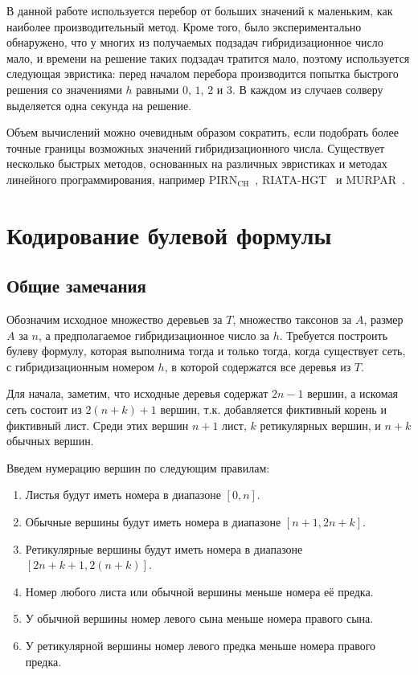 В данной работе используется перебор от больших значений к маленьким, как наиболее производительный метод.
Кроме того, было экспериментально обнаружено, что у многих из получаемых подзадач гибридизационное число мало, и времени на решение таких подзадач тратится мало, поэтому используется следующая эвристика: перед началом перебора производится попытка быстрого решения со значениями $h$ равными $0$, $1$, $2$ и $3$. В каждом из случаев солверу выделяется одна секунда на решение.


Объем вычислений можно очевидным образом сократить, если подобрать более точные границы возможных значений гибридизационного числа.
Существует несколько быстрых методов, основанных на различных эвристиках и методах линейного программирования, например PIRN$\mathrm{_{CH}}$~\cite{wu2010close}, RIATA-HGT~\cite{nakhleh2005riata} и MURPAR~\cite{park2012murpar}.

\FloatBarrier
\section{Кодирование булевой формулы}

\subsection{Общие замечания}

Обозначим исходное множество деревьев за $T$, множество таксонов за $A$, размер $A$ за $n$, а предполагаемое гибридизационное число за $h$. Требуется построить булеву формулу, которая выполнима тогда и только тогда, когда существует сеть, с гибридизационным номером $h$, в которой содержатся все деревья из $T$.

Для начала, заметим, что исходные деревья содержат $2 n - 1$ вершин, а искомая сеть состоит из $2 (n + k) + 1$ вершин, т.к. добавляется фиктивный корень и фиктивный лист. Среди этих вершин $n + 1$ лист, $k$ ретикулярных вершин, и $n + k$ обычных вершин.

Введем нумерацию вершин по следующим правилам:

\begin{enumerate}
	\item Листья будут иметь номера в диапазоне $[0, n]$.
	\item Обычные вершины будут иметь номера в диапазоне $[n + 1, 2n + k]$.
	\item Ретикулярные вершины будут иметь номера в диапазоне $[2n + k + 1, 2(n + k)]$.
	\item Номер любого листа или обычной вершины меньше номера её предка.
	\item У обычной вершины номер левого сына меньше номера правого сына.
	\item У ретикулярной вершины номер левого предка меньше номера правого предка.
\end{enumerate}

